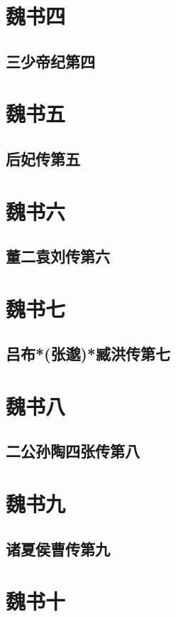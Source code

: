 \documentclass[12pt,UTF8]{ctexbook}
\begin{document}
\part{魏书四}

\chapter{三少帝纪第四}

\part{魏书五}

\chapter{后妃传第五}

\part{魏书六}
\chapter{董二袁刘传第六}

\part{魏书七}
\chapter{吕布*(张邈)*臧洪传第七}

\part{魏书八}
\chapter{二公孙陶四张传第八}

\part{魏书九}
\chapter{诸夏侯曹传第九}

\part{魏书十}
\end{document}
